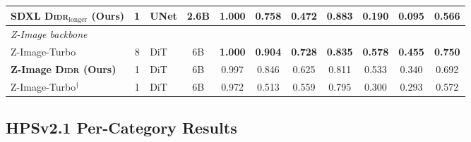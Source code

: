 \begin{table}[!h]
{\begin{tabular}{lclcccccccc}
\textbf{SDXL \textsc{Didr}$_{\text{longer}}$ (Ours)}    & 1 & UNet & 2.6B & \textbf{1.000} & \textbf{0.758} & 0.472 & 0.883 & 0.190 & 0.095 & 0.566 \\
\midrule
\multicolumn{11}{l}{\textit{Z-Image backbone}} \\
Z-Image-Turbo~\citep{zimage}                     & 8 & DiT & 6B & \textbf{1.000} & \textbf{0.904} & \textbf{0.728} & \textbf{0.835} & \textbf{0.578} & \textbf{0.455} & \textbf{0.750} \\
\textbf{Z-Image \textsc{Didr} (Ours)}            & 1 & DiT & 6B & 0.997 & 0.846 & 0.625 & 0.811 & 0.533 & 0.340 & 0.692 \\
\hdashline
Z-Image-Turbo$^\dagger$~\citep{zimage}           & 1 & DiT & 6B & 0.972 & 0.513 & 0.559 & 0.795 & 0.300 & 0.293 & 0.572 \\
\bottomrule
\end{tabular}}
\end{table}

\subsection*{HPSv2.1 Per-Category Results}
\label{app:hpsv2}

